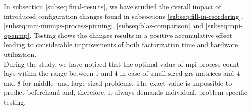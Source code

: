 



In subsection \ref{subseq:final-results}, we have studied the overall impact of introduced configuration changes found in subsections \ref{subseq:fill-in-reordering}, \ref{subseq:mm-mumps-process-pinning}, \ref{subseq:blas-comparison} and \ref{subseq:mpi-openmp}. Testing shows the changes results in a positive accumulative effect leading to considerable improvements of both factorization time and hardware utilization.\\



During the study, we have noticed that the optimal value of \acrshort{mpi} process count lays within the range between 1 and 4 in case of small-sized \acrshort{grs} matrices and 4 and 8 for middle- and large-sized problems. The exact value is impossible to predict beforehand and, therefore, it always demands individual, problem-specific testing.\\
